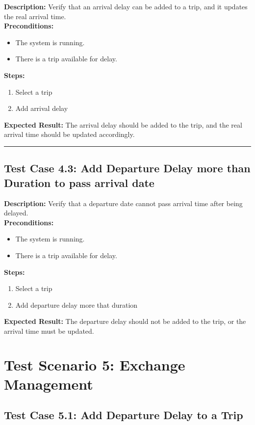 \documentclass{article}
\begin{document}
\textbf{Description:} Verify that an arrival delay can be added to a trip, and it updates the real arrival time.\\
\textbf{Preconditions:}
\begin{itemize}
  \item The system is running.
  \item There is a trip available for delay.
\end{itemize}
\textbf{Steps:}
\begin{enumerate}
    \item Select a trip
    \item Add arrival delay
\end{enumerate}
\textbf{Expected Result:} The arrival delay should be added to the trip, and the real arrival time should be updated accordingly.

\bigskip
\hrule
\bigskip

\subsection{Test Case 4.3: Add Departure Delay more than Duration to pass arrival date}

\textbf{Description:} Verify that a departure date cannot pass arrival time after being delayed.\\
\textbf{Preconditions:}
\begin{itemize}
  \item The system is running.
  \item There is a trip available for delay.
\end{itemize}
\textbf{Steps:}
\begin{enumerate}
    \item Select a trip
    \item Add departure delay more that duration
\end{enumerate}
\textbf{Expected Result:} The departure delay should not be added to the trip, or the arrival time must be updated.

\pagebreak

\section{Test Scenario 5: Exchange Management}
\bigskip
\bigskip
\subsection{Test Case 5.1: Add Departure Delay to a Trip}
\end{document}
